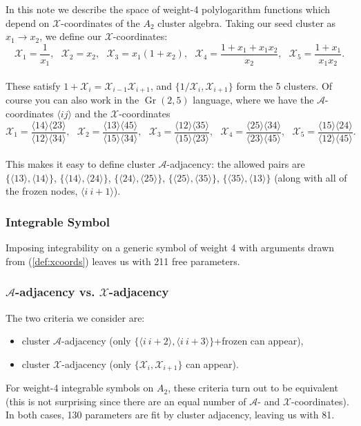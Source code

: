 \documentclass[12pt]{article}
\DeclareMathOperator{\Gr}{Gr}
\def\ket#1{\langle #1 \rangle}
\def\a{\mathcal{A}}
\def\x{\mathcal{X}}
\begin{document}
\thispagestyle{fancyplain}
 
\fancyhf{}
 
\cfoot{\fancyplain{}{\thepage}}


\noindent In this note we describe the space of weight-4 polylogarithm functions which depend on $\mathcal{X}$-coordinates of the $A_2$ cluster algebra. Taking our seed cluster as $x_1\to x_2$, we define our $\x$-coordinates:\\
\begin{equation}\label{def:xcoords}
	\x_1 = \frac{1}{x_1}, ~~~\x_2 = x_2,~~~ \x_3 = x_1 (1 + x_2),~~~ \x_4=\frac{1+x_1+x_1 x_2}{x_2},~~~ \x_5 = \frac{1+x_1}{x_1 x_2}.
\end{equation}\\
These satisfy $1+\x_i = \x_{i-1}\x_{i+1}$, and $\{1/\x_i, \x_{i+1}\}$ form the 5 clusters. Of course you can also work in the $\Gr(2,5)$ language, where we have the $\a$-coordinates $\ket{ij}$ and the $\x$-coordinates\\
\begin{equation}
	\x_1 = \frac{\ket{14}\ket{23}}{\ket{12}\ket{34}}, ~~~\x_2 = \frac{\ket{13}\ket{45}}{\ket{15}\ket{34}},~~~ \x_3 = \frac{\ket{12}\ket{35}}{\ket{15}\ket{23}},~~~ \x_4=\frac{\ket{25}\ket{34}}{\ket{23}\ket{45}},~~~ \x_5 = \frac{\ket{15}\ket{24}}{\ket{12}\ket{45}}.
\end{equation}\\
This makes it easy to define cluster $\a$-adjacency: the allowed pairs are $\{\ket{13},\ket{14}\}$, $\{\ket{14},\ket{24}\}$, $\{\ket{24},\ket{25}\}$, $\{\ket{25},\ket{35}\}$, $\{\ket{35},\ket{13}\}$ (along with all of the frozen nodes, $\ket{i~i+1}$). 

\subsubsection*{Integrable Symbol}		
Imposing integrability on a generic symbol of weight 4 with arguments drawn from (\ref{def:xcoords}) leaves us with 211 free parameters. 

\subsubsection*{$\a$-adjacency vs. $\x$-adjacency}
The two criteria we consider are:
\begin{itemize}
	\item cluster $\a$-adjacency (only $\{\ket{i~i+2},\ket{i~i+3}\}$+frozen can appear),
	\item cluster $\x$-adjacency (only $\{\x_i,\x_{i+1}\}$ can appear).
\end{itemize}
For weight-4 integrable symbols on $A_2$, these criteria turn out to be equivalent (this is not surprising since there are an equal number of $\a$- and $\x$-coordinates). In both cases, 130 parameters are fit by cluster adjacency, leaving us with 81.
\end{document}
